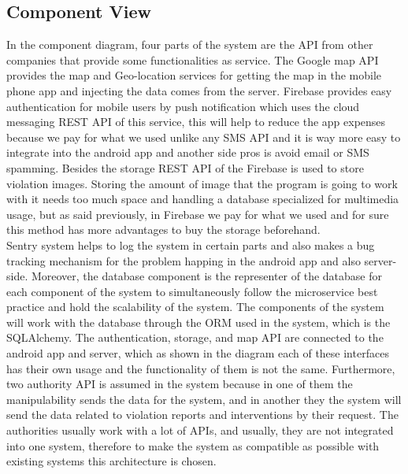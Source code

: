 \subsection{Component View}
In the component diagram, four parts of the system are the API from other companies that provide some functionalities as service. The Google map API provides the map and Geo-location services for getting the map in the mobile phone app and injecting the data comes from the server. Firebase provides easy authentication for mobile users by push notification which uses the cloud messaging  REST API of this service, this will help to reduce the app expenses because we pay for what we used unlike any SMS API and it is way more easy to integrate into the android app and another side pros is avoid email or SMS spamming. Besides the storage  REST API  of the Firebase is used to store violation images. Storing the amount of image that the program is going to work with it needs too much space and handling a database specialized for multimedia usage, but as said previously, in Firebase we pay for what we used and for sure this method has more advantages to buy the storage beforehand.\\
Sentry system helps to log the system in certain parts and also makes a bug tracking mechanism for the problem happing in the android app and also server-side. Moreover, the database component is the representer of the database for each component of the system to simultaneously follow the microservice best practice and hold the scalability of the system. The components of the system will work with the database through the ORM used in the system, which is the SQLAlchemy. The authentication, storage, and map API are connected to the android app and server, which as shown in the diagram each of these interfaces has their own usage and the functionality of them is not the same. Furthermore, two authority API is assumed in the system because in one of them the manipulability sends the data for the system, and in another they the system will send the data related to violation reports and interventions by their request. The authorities usually work with a lot of APIs, and usually, they are not integrated into one system, therefore to make the system as compatible as possible with existing systems this architecture is chosen.\\
